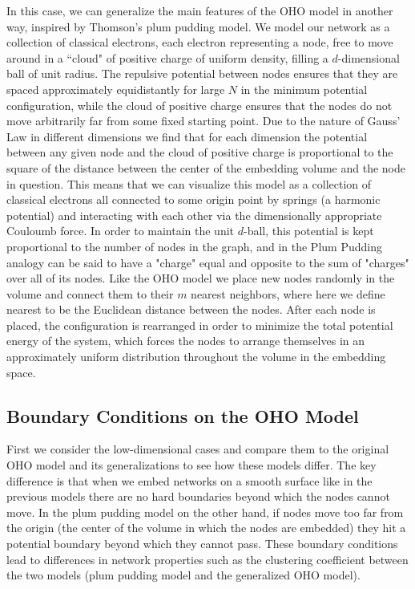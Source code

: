 \documentclass[aps,pre,reprint,superscriptaddress,amsmath,amssymb,nofootinbib]{revtex4-1}
\begin{document}
In this case, we can generalize the main features of the OHO model in another way, inspired by Thomson's plum pudding model.
We model our network as a collection of classical electrons, each electron representing a node, free to move around in a ``cloud" of positive charge of uniform density, filling a $d$-dimensional ball of unit radius.
The repulsive potential between nodes ensures that they are spaced approximately equidistantly for large $N$ in the minimum potential configuration, while the cloud of positive charge ensures that the nodes do not move arbitrarily far from some fixed starting point.
Due to the nature of Gauss' Law in different dimensions we find that for each dimension the potential between any given node and the cloud of positive charge is proportional to the square of the distance between the center of the embedding volume and the node in question.
This means that we can visualize this model as a collection of classical electrons all connected to some origin point by springs (a harmonic potential) and interacting with each other via the dimensionally appropriate Couloumb force.  
In order to maintain the unit $d$-ball, this potential is kept proportional to the number of nodes in the graph, and in the Plum Pudding analogy can be said to have a "charge" equal and opposite to the sum of "charges" over all of its nodes.
Like the OHO model we place new nodes randomly in the volume and connect them to their $m$ nearest neighbors, where here we define nearest to be the Euclidean distance between the nodes.
After each node is placed, the configuration is rearranged in order to minimize the total potential energy of the system, which forces the nodes to arrange themselves in an approximately uniform distribution throughout the volume in the embedding space.



\subsection{Boundary Conditions on the OHO Model}
First we consider the low-dimensional cases and compare them to the original OHO model and its generalizations to see how these models differ.
The key difference is that when we embed networks on a smooth surface like in the previous models there are no hard boundaries beyond which the nodes cannot move.
In the plum pudding model on the other hand, if nodes move too far from the origin (the center of the volume in which the nodes are embedded) they hit a potential boundary beyond which they cannot pass.
These boundary conditions lead to differences in network properties such as the clustering coefficient between the two models (plum pudding model and the generalized OHO model).
\end{document}
